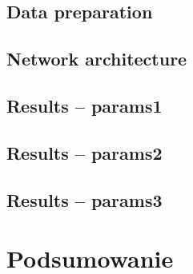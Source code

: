 \documentclass{pracalicmgr2021}
\begin{document}
    \section{Data preparation}
    
    \section{Network architecture}
    
    \section{Results -- params1}
    
    \section{Results -- params2}
    
    \section{Results -- params3}
    
    
    \chapter{Podsumowanie}



\end{document}
